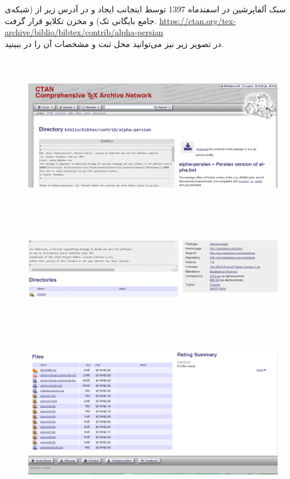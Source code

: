 \documentclass{article}
\begin{document}
\vspace*{2cm}
سبک آلفاپرشین در اسفندماه  1397 توسط اینجانب ایجاد و در آدرس
زیر از 
(شبکه‌ی جامع بایگانی تک) و مخزن تکلایو قرار گرفت.
\href{https://ctan.org/tex-archive/biblio/bibtex/contrib/alpha-persian}{https://ctan.org/tex-archive/biblio/bibtex/contrib/alpha-persian}\\[.6cm]
در تصویر زیر نیز می‌توانید محل ثبت و مشخصات آن را در 
ببینید.
\begin{figure}[H]
\centering
\includegraphics[width=\textwidth,height=7cm]{image/sh18}
\end{figure}\vspace*{-.87cm}
\begin{figure}[H]
\centering
\includegraphics[width=\textwidth,height=4cm]{image/sh20}
 \end{figure}
\begin{figure}[H]
\centering
\includegraphics[width=\textwidth,height=8cm]{image/21}
\end{figure}
\end{document}
